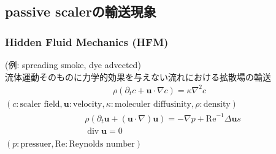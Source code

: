 \documentclass[xcolor=dvipsnames,hyperref={breaklinks=true},mathserif,professionalfont,dvipdfmx,12pt]{beamer}
\begin{document}
\subsection{passive scalerの輸送現象}
\begin{frame}
  \frametitle{Hidden Fluid Mechanics (HFM)}
   \small (例: spreading smoke, dye advected)\normalsize\\
  \scriptsize 流体運動そのものに力学的効果を与えない流れにおける拡散場の輸送 \normalsize\\
  \footnotesize {}\normalsize
  \begin{align*}
    \rho\left(\partial_t c+\bm{u}\cdot \nabla c\right)=\kappa\nabla^2c
  \end{align*}
  \footnotesize$\left(c: \text{scaler field}, \bm{u}: \text{velocity}, \kappa: \text{moleculer diffusinity}, \rho: \text{density}\right)$\normalsize\\
  \footnotesize {} \normalsize
  \footnotesize
  \begin{align*}
    \begin{aligned}
        &\rho\left(\partial_{t} \bm{u}+(\bm{u} \cdot \nabla) \bm{u}\right)=-\nabla p+\mathrm{Re}^{-1} \Delta \bm{u}s\\
        &\operatorname{div}\bm{u}=0
      \end{aligned}
  \end{align*}
  \footnotesize$\left(p: \text{pressuer}, \mathrm{Re}: \text{Reynolds number}\right)$\normalsize
\end{frame}
\end{document}

